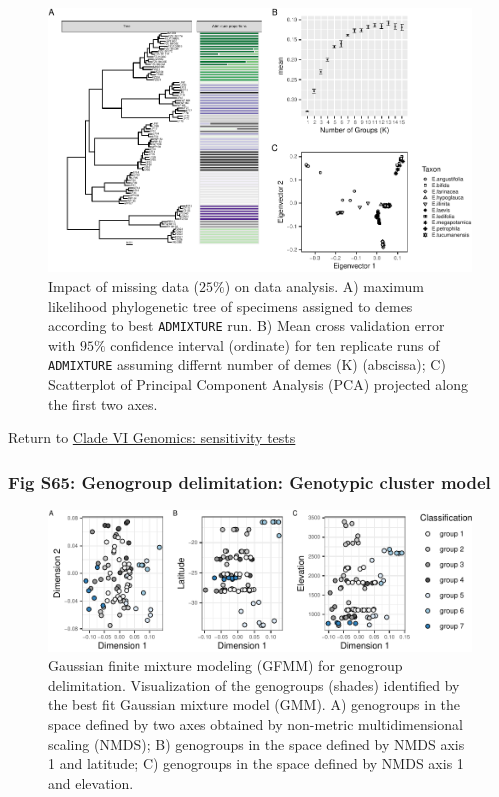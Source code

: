 \documentclass[
  11pt,
]{article}
\begin{document}
\begin{figure}
\includegraphics{Supplementary_Material_files/figure-latex/cladeVIgenomicSensitivityAnalysesSmallestplots-1} \caption{Impact of missing data ($25\%$) on data analysis. A) maximum likelihood phylogenetic tree of specimens assigned to demes according to best \texttt{ADMIXTURE} run. B) Mean cross validation error with $95\%$ confidence interval (ordinate) for ten replicate runs of \texttt{ADMIXTURE} assuming differnt number of demes (K) (abscissa); C) Scatterplot of Principal Component Analysis (PCA) projected along the first two axes.}\label{fig:cladeVIgenomicSensitivityAnalysesSmallestplots}
\end{figure}

Return to \protect\hyperlink{sensitivity-tests-5}{Clade VI Genomics: sensitivity tests}
\pagebreak

\hypertarget{fig-s65-genogroup-delimitation-genotypic-cluster-model}{%
\subsubsection{Fig S65: Genogroup delimitation: Genotypic cluster model}\label{fig-s65-genogroup-delimitation-genotypic-cluster-model}}

\begin{figure}
\includegraphics{Supplementary_Material_files/figure-latex/cladeVImolecularDelimitationsNmms-1} \caption{Gaussian finite mixture modeling (GFMM) for genogroup delimitation. Visualization of the genogroups (shades) identified by the best fit Gaussian mixture model (GMM). A) genogroups in the space defined by two axes obtained by non-metric multidimensional scaling (NMDS); B) genogroups in the space defined by NMDS axis 1 and latitude; C) genogroups in the space defined by NMDS axis 1 and elevation.}\label{fig:cladeVImolecularDelimitationsNmms}
\end{figure}
\end{document}

